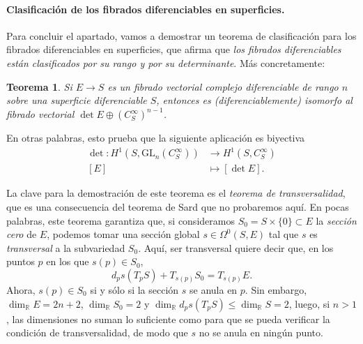 \documentclass[12pt,a4paper]{article}
\newtheorem{thm}{Teorema}[section]
\theoremstyle{definition} \newtheorem{defn}[thm]{Definición}
\theoremstyle{definition} \newtheorem{ejemplo}[thm]{Ejemplo}
\theoremstyle{definition} \newtheorem{ejercicio}[thm]{Ejercicio}
\def\GL{\mathrm{GL}}
\begin{document}
	      \paragraph{Clasificación de los fibrados diferenciables en superficies.} Para concluir el apartado, vamos a demostrar un teorema de clasificación para los fibrados diferenciables en superficies, que afirma que \emph{los fibrados diferenciables están clasificados por su rango y por su determinante}. Más concretamente:
	      \begin{thm}
		Si $E\rightarrow S$ es un fibrado vectorial complejo diferenciable de rango $n$ sobre una superficie diferenciable $S$, entonces es (diferenciablemente) isomorfo al fibrado vectorial $\det E \oplus (C^\infty_S)^{n-1}$. 
	      \end{thm}

	      En otras palabras, esto prueba que la siguiente aplicación es biyectiva
	      \begin{align*}
		\det :H^1(S, \GL_n(C_S^\infty))&\longrightarrow H^1(S,C^\infty_S)\\ 
		[E] &\longmapsto [\det E].
		\end{align*}

	      La clave para la demostración de este teorema es el \emph{teorema de transversalidad}, que es una consecuencia del teorema de Sard que no probaremos aquí. En pocas palabras, este teorema garantiza que, si consideramos $S_0 = S\times \{0\} \subset E$ la \emph{sección cero} de $E$, podemos tomar una sección global $s \in \Omega^0(S,E)$ tal que $s$ es \emph{transversal} a la subvariedad $S_0$. Aquí, ser transversal quiere decir que, en los puntos $p$ en los que $s(p) \in S_0$,
	      \begin{equation*}
		d_ps (T_p S) + T_{s(p)}S_0 = T_{s(p)} E.
	      \end{equation*}
	      Ahora, $s(p) \in S_0$ si y sólo si la sección $s$ se anula en $p$. Sin embargo, $\dim_{\mathbb{R}} E = 2n +2$, $\dim_{\mathbb{R}} S_0 = 2$ y $\dim_{\mathbb{R}} d_ps(T_pS) \leq \dim_{\mathbb{R}} S = 2$, luego, si $n>1$, las dimensiones no suman lo suficiente como para que se pueda verificar la condición de transversalidad, de modo que $s$ no se anula en ningún punto. 
\end{document}

